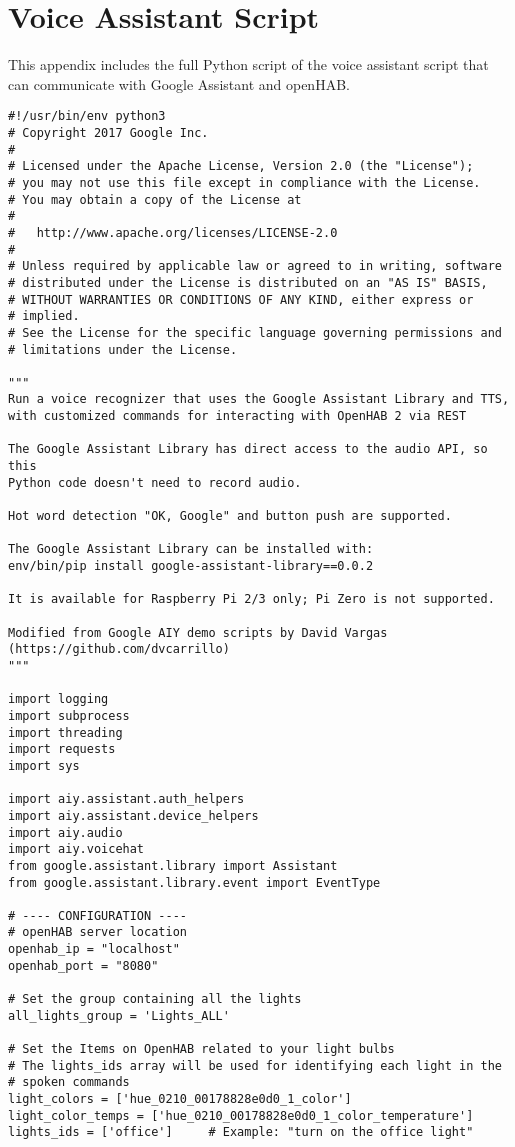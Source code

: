 \chapter{Voice Assistant Script}

This appendix includes the full Python script of the voice assistant script that can communicate with Google Assistant and openHAB.

\begin{lstlisting}[style=PythonCode]
#!/usr/bin/env python3
# Copyright 2017 Google Inc.
#
# Licensed under the Apache License, Version 2.0 (the "License");
# you may not use this file except in compliance with the License.
# You may obtain a copy of the License at
#
#   http://www.apache.org/licenses/LICENSE-2.0
#
# Unless required by applicable law or agreed to in writing, software
# distributed under the License is distributed on an "AS IS" BASIS,
# WITHOUT WARRANTIES OR CONDITIONS OF ANY KIND, either express or
# implied.
# See the License for the specific language governing permissions and
# limitations under the License.

"""
Run a voice recognizer that uses the Google Assistant Library and TTS,
with customized commands for interacting with OpenHAB 2 via REST

The Google Assistant Library has direct access to the audio API, so this
Python code doesn't need to record audio.

Hot word detection "OK, Google" and button push are supported.

The Google Assistant Library can be installed with:
env/bin/pip install google-assistant-library==0.0.2

It is available for Raspberry Pi 2/3 only; Pi Zero is not supported.

Modified from Google AIY demo scripts by David Vargas
(https://github.com/dvcarrillo)
"""

import logging
import subprocess
import threading
import requests
import sys

import aiy.assistant.auth_helpers
import aiy.assistant.device_helpers
import aiy.audio
import aiy.voicehat
from google.assistant.library import Assistant
from google.assistant.library.event import EventType

# ---- CONFIGURATION ----
# openHAB server location
openhab_ip = "localhost"
openhab_port = "8080"

# Set the group containing all the lights
all_lights_group = 'Lights_ALL'

# Set the Items on OpenHAB related to your light bulbs
# The lights_ids array will be used for identifying each light in the
# spoken commands
light_colors = ['hue_0210_00178828e0d0_1_color']
light_color_temps = ['hue_0210_00178828e0d0_1_color_temperature']
lights_ids = ['office']     # Example: "turn on the office light"


\end{lstlisting}
